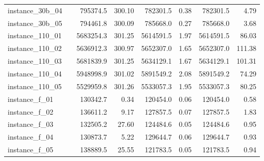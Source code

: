 \documentclass[12pt,a4paper,openright,twoside]{book}
\begin{document}
\begin{table}[H]
{\begin{tabular}{|ll|rr|rr|rr|}
 instance\_30b\_04                   &     &   795374.5 &    300.10 &   782301.5 &     0.38 &    782301.5 &     4.79 \\   
 instance\_30b\_05                   &     &   794461.8 &    300.09 &   785668.0 &     0.27 &    785668.0 &     3.68 \\   
 instance\_110\_01                  &     &  5683254.3 &    301.25 &  5614591.5 &     1.97 &   5614591.5 &    86.03 \\   
 instance\_110\_02                  &     &  5636912.3 &    300.97 &  5652307.0 &     1.65 &   5652307.0 &   111.38 \\   
 instance\_110\_03                  &     &  5681839.9 &    301.25 &  5634129.1 &     1.67 &   5634129.1 &   101.31 \\   
 instance\_110\_04                  &     &  5948998.9 &    301.02 &  5891549.2 &     2.08 &   5891549.2 &    74.29 \\   
 instance\_110\_05                  &     &  5529959.8 &    301.26 &  5533057.3 &     1.95 &   5533057.3 &    80.25 \\  
 instance\_f\_01                    &     &   130342.7 &      0.34 &   120454.0 &     0.06 &    120454.0 &     0.58 \\   
 instance\_f\_02                    &     &   136611.2 &      9.17 &   127857.5 &     0.07 &    127857.5 &     1.83 \\   
 instance\_f\_03                    &     &   132505.2 &     27.60 &   124484.6 &     0.05 &    124484.6 &     0.95 \\   
 instance\_f\_04                    &     &   130873.7 &      5.22 &   129644.7 &     0.06 &    129644.7 &     0.93 \\   
 instance\_f\_05                    &     &   138889.5 &     25.55 &   121783.5 &     0.05 &    121783.5 &     0.94 \\ 
  \hline
\end{tabular}
}
\end{table}
\end{document}
